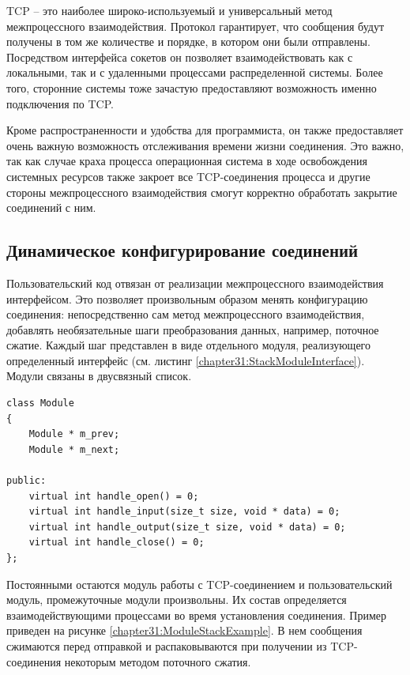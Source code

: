 TCP -- это наиболее широко-используемый и универсальный метод межпроцессного взаимодействия. Протокол гарантирует, что сообщения будут получены в том же количестве и порядке, в котором они были отправлены. Посредством интерфейса сокетов он позволяет взаимодействовать как с локальными, так и с удаленными процессами распределенной системы. Более того, сторонние системы тоже зачастую предоставляют возможность именно подключения по TCP.

Кроме распространенности и удобства для программиста, он также предоставляет очень важную возможность отслеживания времени жизни соединения. Это важно, так как случае краха процесса операционная система в ходе освобождения системных ресурсов также закроет все TCP-соединения процесса и другие стороны межпроцессного взаимодействия смогут корректно обработать закрытие соединений с ним.

\subsection{Динамическое конфигурирование соединений}\label{chapter31:DynamicConfigure}

Пользовательский код отвязан от реализации межпроцессного взаимодействия интерфейсом. Это позволяет произвольным образом менять конфигурацию соединения: непосредственно сам метод межпроцессного взаимодействия, добавлять необязательные шаги преобразования данных, например, поточное сжатие. Каждый шаг представлен в виде отдельного модуля, реализующего определенный интерфейс (см. листинг \ref{chapter31:StackModuleInterface}). Модули связаны в двусвязный список.

\begin{lstlisting}[float=!h,caption={Интерфейс низкоуровневого обработчика соединений на C++},label={chapter31:StackModuleInterface}]
class Module
{
	Module * m_prev;
	Module * m_next;
	
public:
	virtual int handle_open() = 0;
	virtual int handle_input(size_t size, void * data) = 0;
	virtual int handle_output(size_t size, void * data) = 0;
	virtual int handle_close() = 0;
};
\end{lstlisting}

Постоянными остаются модуль работы с TCP-соединением и пользовательский модуль, промежуточные модули произвольны. Их состав определяется взаимодействующими процессами во время установления соединения. Пример приведен на рисунке \ref{chapter31:ModuleStackExample}. В нем сообщения сжимаются перед отправкой и распаковываются при получении из TCP-соединения некоторым методом поточного сжатия.

